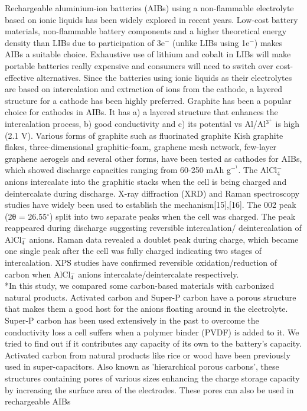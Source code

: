 \documentclass{article}
\begin{document}
Rechargeable aluminium-ion batteries (AIBs) using a non-flammable electrolyte based on ionic liquids has been widely explored in recent years. Low-cost battery materials, non-flammable battery components and a higher theoretical energy density than LIBs due to participation of 3e$^-$ (unlike LIBs using 1e$^-$) makes AIBs a suitable choice\cite{ambroz_trends_2017}. Exhaustive use of lithium and cobalt in LIBs will make portable batteries really expensive and consumers will need to switch over cost-effective alternatives. Since the batteries using ionic liquids as their electrolytes are based on intercalation and extraction of ions from the cathode, a layered structure for a cathode has been highly preferred.   
Graphite has been a popular choice for cathodes in AIBs. It has a) a layered structure that enhances the intercalation process, b) good conductivity and c) its potential vs Al/Al$^3^+$ is high (2.1 V). Various forms of graphite such as fluorinated graphite \citet{} Kish graphite flakes\cite{}, three-dimensional graphitic-foam\cite{}, graphene mesh network\cite{}, few-layer graphene aerogels\cite{} and several other forms, have been tested as cathodes for AIBs, which showed discharge capacities ranging from 60-250 mAh g$^-^1$. The AlCl$_4^-$ anions intercalate into the graphitic stacks when the cell is being charged and deintercalate during discharge. X-ray diffraction (XRD) and Raman spectroscopy studies have widely been used to establish the mechanism[15],[16]. The 002 peak (2θ = 26.55$^{\circ}$) split into two separate peaks when the cell was charged. The peak reappeared during discharge suggesting reversible intercalation/ deintercalation of AlCl$_4^-$ anions. Raman data revealed a doublet peak during charge, which became one single peak after the cell was fully charged indicating two stages of intercalation. XPS studies have confirmed reversible oxidation/reduction of carbon when AlCl$_4^-$ anions intercalate/deintercalate respectively. \\*In this study, we compared some carbon-based materials with carbonized natural products. Activated carbon and Super-P carbon have a porous structure that makes them a good host for the anions floating around in the electrolyte. Super-P carbon has been used extensively in the past to overcome the conductivity loss a cell suffers when a polymer binder (PVDF) is added to it. We tried to find out if it contributes any capacity of its own to the battery's capacity. Activated carbon from natural products like rice\citet{} or wood\citet{} have been previously used in super-capacitors. Also known as 'hierarchical porous carbons', these structures containing pores of various sizes enhancing the charge storage capacity by increasing the surface area of the electrodes\cite{}. These pores can also be used in rechargeable AIBs   
\end{document}
